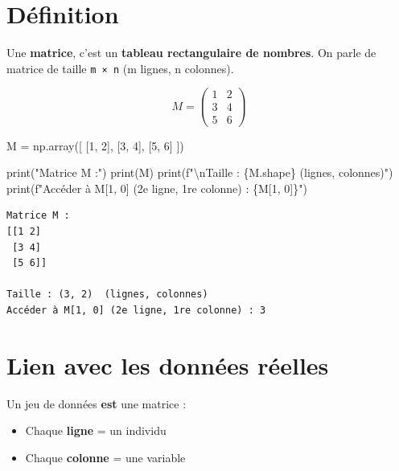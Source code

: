 \documentclass[
  french,
  11pt,
  a4paper,
]{scrbook}
\newenvironment{Shaded}{}{}
\newcommand{\BuiltInTok}[1]{\textcolor[rgb]{0.84,0.23,0.29}{#1}}
\newcommand{\CharTok}[1]{\textcolor[rgb]{0.01,0.18,0.38}{#1}}
\newcommand{\DecValTok}[1]{\textcolor[rgb]{0.00,0.36,0.77}{#1}}
\newcommand{\NormalTok}[1]{\textcolor[rgb]{0.14,0.16,0.18}{#1}}
\newcommand{\OperatorTok}[1]{\textcolor[rgb]{0.14,0.16,0.18}{#1}}
\newcommand{\SpecialCharTok}[1]{\textcolor[rgb]{0.00,0.36,0.77}{#1}}
\newcommand{\SpecialStringTok}[1]{\textcolor[rgb]{0.01,0.18,0.38}{#1}}
\newcommand{\StringTok}[1]{\textcolor[rgb]{0.01,0.18,0.38}{#1}}
\providecommand{\tightlist}{%
  \setlength{\itemsep}{0pt}\setlength{\parskip}{0pt}}
\begin{document}
\section{Définition}\label{duxe9finition-1}

Une \textbf{matrice}, c'est un \textbf{tableau rectangulaire de
nombres}. On parle de matrice de taille \texttt{m\ ×\ n} (m lignes, n
colonnes).

\[M = \begin{pmatrix} 1 & 2 \\ 3 & 4 \\ 5 & 6 \end{pmatrix}\]

\begin{Shaded}
\begin{Highlighting}[]
\NormalTok{M }\OperatorTok{=}\NormalTok{ np.array([}
\NormalTok{    [}\DecValTok{1}\NormalTok{, }\DecValTok{2}\NormalTok{],}
\NormalTok{    [}\DecValTok{3}\NormalTok{, }\DecValTok{4}\NormalTok{],}
\NormalTok{    [}\DecValTok{5}\NormalTok{, }\DecValTok{6}\NormalTok{]}
\NormalTok{])}

\BuiltInTok{print}\NormalTok{(}\StringTok{"Matrice M :"}\NormalTok{)}
\BuiltInTok{print}\NormalTok{(M)}
\BuiltInTok{print}\NormalTok{(}\SpecialStringTok{f"}\CharTok{\textbackslash{}n}\SpecialStringTok{Taille : }\SpecialCharTok{\{}\NormalTok{M}\SpecialCharTok{.}\NormalTok{shape}\SpecialCharTok{\}}\SpecialStringTok{  (lignes, colonnes)"}\NormalTok{)}
\BuiltInTok{print}\NormalTok{(}\SpecialStringTok{f"Accéder à M[1, 0] (2e ligne, 1re colonne) : }\SpecialCharTok{\{}\NormalTok{M[}\DecValTok{1}\NormalTok{, }\DecValTok{0}\NormalTok{]}\SpecialCharTok{\}}\SpecialStringTok{"}\NormalTok{)}
\end{Highlighting}
\end{Shaded}

\begin{verbatim}
Matrice M :
[[1 2]
 [3 4]
 [5 6]]

Taille : (3, 2)  (lignes, colonnes)
Accéder à M[1, 0] (2e ligne, 1re colonne) : 3
\end{verbatim}

\section{Lien avec les données
réelles}\label{lien-avec-les-donnuxe9es-ruxe9elles}

Un jeu de données \textbf{est} une matrice :

\begin{itemize}
\tightlist
\item
  Chaque \textbf{ligne} = un individu
\item
  Chaque \textbf{colonne} = une variable
\end{itemize}
\end{document}
